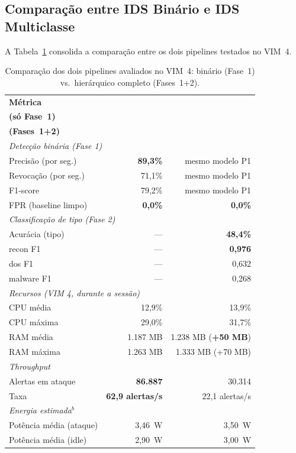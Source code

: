 \documentclass[12pt]{article}
\begin{document}
\subsection{Comparação entre IDS Binário e IDS Multiclasse}
\label{subsec:res_comp}

A Tabela~\ref{tab:comparison} consolida a comparação entre os dois pipelines
testados no VIM~4.

\begin{table}[ht]
\centering
\caption{Comparação dos dois pipelines avaliados no VIM~4: binário (Fase~1) vs.\ hierárquico completo (Fases~1+2).}
\label{tab:comparison}
\begin{tabular}{@{}lrr@{}}
\toprule
\textbf{Métrica} & \shortstack[r]{\textbf{IDS Binário}\\ \textbf{(só Fase~1)}}
                 & \shortstack[r]{\textbf{IDS Multiclasse}\\ \textbf{(Fases~1+2)}} \\ \midrule
\multicolumn{3}{l}{\textit{Detecção binária (Fase 1)}} \\
\quad Precisão (por seg.) & \textbf{89,3\%} & mesmo modelo P1 \\
\quad Revocação (por seg.) & 71,1\%         & mesmo modelo P1 \\
\quad F1-score            & 79,2\%          & mesmo modelo P1 \\
\quad FPR (baseline limpo) & \textbf{0,0\%} & \textbf{0,0\%} \\ \midrule
\multicolumn{3}{l}{\textit{Classificação de tipo (Fase 2)}} \\
\quad Acurácia (tipo)   & —               & \textbf{48,4\%} \\
\quad recon F1          & —               & \textbf{0,976} \\
\quad dos F1            & —               & 0,632 \\
\quad malware F1        & —               & 0,268 \\
\midrule
\multicolumn{3}{l}{\textit{Recursos (VIM 4, durante a sessão)}} \\
\quad CPU média         & 12,9\%          & 13,9\% \\
\quad CPU máxima        & 29,0\%          & 31,7\% \\
\quad RAM média         & 1.187 MB        & 1.238 MB (\textbf{+50 MB}) \\
\quad RAM máxima        & 1.263 MB        & 1.333 MB (+70 MB) \\ \midrule
\multicolumn{3}{l}{\textit{Throughput}} \\
\quad Alertas em ataque & \textbf{86.887}  & 30.314 \\
\quad Taxa              & \textbf{62,9 alertas/s} & 22,1 alertas/s \\ \midrule
\multicolumn{3}{l}{\textit{Energia estimada$^{b}$}} \\
\quad Potência média (ataque) & 3,46~W & 3,50~W \\
\quad Potência média (idle)   & 2,90~W & 3,00~W \\
\bottomrule
\end{tabular}
\end{table}
\end{document}
